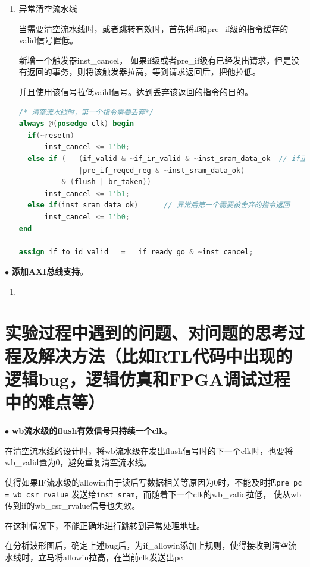 \documentclass[11pt]{article}
\begin{document}
\begin{enumerate}
\item 异常清空流水线

当需要清空流水线时，或者跳转有效时，首先将if和pre\_if级的指令缓存的valid信号置低。

新增一个触发器inst\_cancel，
如果if级或者pre\_if级有已经发出请求，但是没有返回的事务，则将该触发器拉高，等到请求返回后，把他拉低。

并且使用该信号拉低vaild信号。达到丢弃该返回的指令的目的。
\begin{lstlisting}[language=verilog]
  /* 清空流水线时，第一个指令需要丢弃*/
always @(posedge clk) begin
  if(~resetn)
      inst_cancel <= 1'b0;
  else if (   (if_valid & ~if_ir_valid & ~inst_sram_data_ok  // if正在等待指令返回
              |pre_if_reqed_reg & ~inst_sram_data_ok)
          & (flush | br_taken))
      inst_cancel <= 1'b1;
  else if(inst_sram_data_ok)      // 异常后第一个需要被舍弃的指令返回
      inst_cancel <= 1'b0;
end

assign if_to_id_valid   =   if_ready_go & ~inst_cancel;
\end{lstlisting}
\end{enumerate}



\noindent
$\bullet$
\textbf{添加AXI总线支持}。
\vspace{1ex}
\begin{enumerate}
  \item 
\end{enumerate}





\section{实验过程中遇到的问题、对问题的思考过程及解决方法（比如RTL代码中出现的逻辑bug，逻辑仿真和FPGA调试过程中的难点等）}

\noindent
$\bullet$
\textbf{wb流水级的flush有效信号只持续一个clk}。

在清空流水线的设计时，将wb流水级在发出flush信号时的下一个clk时，也要将wb\_valid置为0，避免重复清空流水线。

使得如果IF流水级的allowin由于读后写数据相关等原因为0时，不能及时把\verb|pre_pc = wb_csr_rvalue| 发送给\verb|inst_sram|，而随着下一个clk的wb\_valid拉低，
使从wb传到if的wb\_csr\_rvalue信号也失效。

在这种情况下，不能正确地进行跳转到异常处理地址。

在分析波形图后，确定上述bug后，为if\_allowin添加上规则，使得接收到清空流水线时，立马将allowin拉高，在当前clk发送出pc
\end{document}
